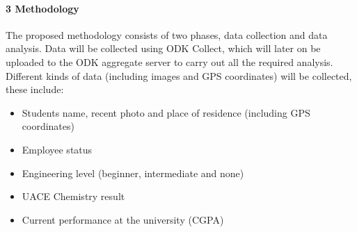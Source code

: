\documentclass[10pt,a4paper]{article}
\begin{document}
\paragraph{3 Methodology}
\begin{flushleft}
The proposed methodology consists of two phases, data collection and data analysis. Data will be collected using ODK Collect, which will later on be uploaded to the ODK aggregate server to carry out all the required analysis. Different kinds of data (including images and GPS coordinates) will be collected, these include:
\begin{itemize}
 \item Students name, recent photo and place of residence (including GPS coordinates)
 \item Employee status
 \item Engineering level (beginner, intermediate and none)
 \item UACE Chemistry result
 \item Current performance at the university (CGPA)
\end{itemize} 
\end{flushleft}
\end{document}
